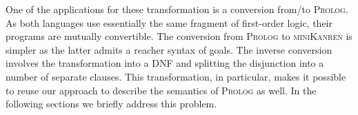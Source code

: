 \begin{comment}
The overall result is not literally the same as what we've shown in Section~\ref{language}, but denotationally equivalent.

The conversion in the opposite direction involves the following steps:

\begin{itemize}
  \item converting between term representation;
  \item moving all ``\lstinline|fresh|'' constructs into the top-level;
  \item transforming the freshless body into DNF;
  \item replacing all unifications with calls for a specific predicate ``\lstinline|unify/2|'', defined as

\begin{lstlisting}
   unify (X, X).
\end{lstlisting}    

  \item splitting the top-level disjunctions into separate clauses with the same head.
\end{itemize}

The correctness of these, again, can be justified denotationally. For the append$^o$ relation in Section~\ref{language} the result
will be as follows:

\begin{lstlisting}
  append (X, Y, Z) :- unify (X, []), unify (Z, Y).
  append (X, Y, Z) :-
    unify (X, [H$|$T]),
    unify (Z, [H$|$TY]),
    append (T, Y, TY).
\end{lstlisting}

\end{comment}

One of the applications for these transformation is a conversion from/to \textsc{Prolog}. As both languages use essentially the same fragment of first-order logic,
their programs are mutually convertible. The conversion from \textsc{Prolog} to \textsc{miniKanren} is simpler as the latter admits a reacher syntax of goals. The inverse
conversion involves the transformation into a DNF and splitting the disjunction into a number of separate clauses. This transformation, in particular, makes it possible to
reuse our approach to describe the semantics of \textsc{Prolog} as well. In the following sections we briefly address this problem.

\begin{comment}
We can use these substantiated transformations, for example, to convert an arbitrary \textsc{miniKanren} specification into a form analogous to a specifications in \textsc{Prolog}.
With this conversion we can not only interpret \textsc{Prolog} specifications in interleaving semantics, but we also can, using the certified framework we developed, describe conventional \textsc{Prolog} search strategies.
\end{comment}

